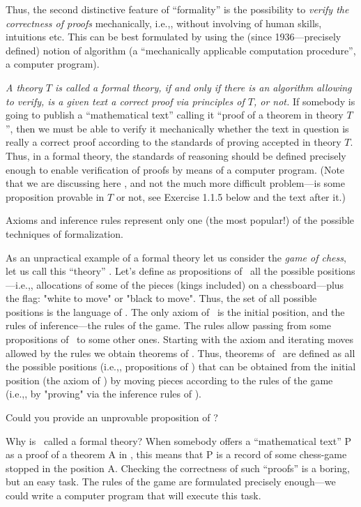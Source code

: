 Thus, the second distinctive feature of ``formality'' is the possibility to \emph{verify the correctness of proofs} mechanically, i.e.,, without involving of human skills, intuitions etc.
This can be best formulated by using the (since 1936---precisely defined) notion of algorithm (a ``mechanically applicable computation procedure'', a computer program).

\emph{A theory \(T\) is called a formal theory, if and only if there is an algorithm allowing to verify, is a given text a correct proof via principles of \(T\), or not.}
If somebody is going to publish a ``mathematical text'' calling it ``proof of a theorem in theory \(T\)'', then we must be able to verify it mechanically whether the text in question is really a correct proof according to the standards of proving accepted in theory \(T\).
Thus, in a formal theory, the standards of reasoning should be defined precisely enough to enable verification of proofs by means of a computer program.
(Note that we are discussing here , and not the much more difficult problem---is some proposition provable in \(T\) or not, see Exercise 1.1.5 below and the text after it.)

Axioms and inference rules represent only one (the most popular!) of the possible techniques of formalization.

As an unpractical example of a formal theory let us consider the \emph{game of chess}, let us call this ``theory'' \CHESS.
Let's define as propositions of \CHESS\ all the possible positions---i.e.,, allocations of some of the pieces (kings included) on a chessboard---plus the flag: "white to move" or "black to move".
Thus, the set of all possible positions is the language of \CHESS.
The only axiom of \CHESS\ is the initial position, and the rules of inference---the rules of the game.
The rules allow passing from some propositions of \CHESS\ to some other ones.
Starting with the axiom and iterating moves allowed by the rules we obtain theorems of \CHESS.
Thus, theorems of \CHESS\ are defined as all the possible positions (i.e.,, propositions of \CHESS) that can be obtained from the initial position (the axiom of \CHESS) by moving pieces according to the rules of the game (i.e.,, by "proving" via the inference rules of \CHESS).

\begin{exercise}
Could you provide an unprovable proposition of \CHESS?
\end{exercise}

Why is \CHESS\ called a formal theory? When somebody offers a ``mathematical text'' P as a proof of a theorem A in \CHESS, this means that P is a record of some chess-game stopped in the position A.
Checking the correctness of such ``proofs'' is a boring, but an easy task.
The rules of the game are formulated precisely enough---we could write a computer program that will execute this task.

